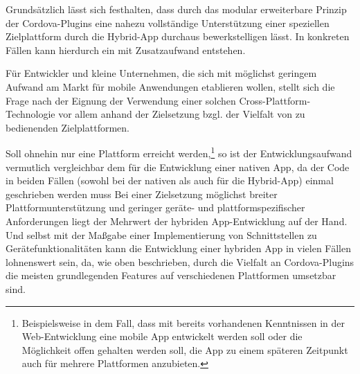 
Grundsätzlich lässt sich festhalten, dass durch das modular erweiterbare Prinzip der Cordova-Plugins eine nahezu vollständige Unterstützung einer speziellen Zielplattform durch die Hybrid-App durchaus bewerkstelligen lässt.
In konkreten Fällen kann hierdurch ein mit Zusatzaufwand entstehen.


Für Entwickler und kleine Unternehmen, die sich mit möglichst geringem Aufwand am Markt für mobile Anwendungen etablieren wollen, stellt sich die Frage nach der Eignung der Verwendung einer solchen Cross-Plattform-Technologie vor allem anhand der Zielsetzung bzgl. der Vielfalt von zu bedienenden Zielplattformen.

Soll ohnehin nur eine Plattform erreicht werden,\footnote{Beispielsweise in dem Fall, dass mit bereits vorhandenen Kenntnissen in der Web-Entwicklung eine mobile App entwickelt werden soll oder die Möglichkeit offen gehalten werden soll, die App zu einem späteren Zeitpunkt auch für mehrere Plattformen anzubieten.} so ist der Entwicklungsaufwand vermutlich vergleichbar dem für die Entwicklung einer nativen App, da der Code in beiden Fällen (sowohl bei der nativen als auch für die Hybrid-App) einmal geschrieben werden muss %
Bei einer Zielsetzung möglichst breiter Plattformunterstützung und geringer geräte- und plattformspezifischer Anforderungen liegt der Mehrwert der hybriden App-Entwicklung auf der Hand.
Und selbst mit der Maßgabe einer Implementierung von Schnittstellen zu Gerätefunktionalitäten kann die Entwicklung einer hybriden App in vielen Fällen lohnenswert sein, da, wie oben beschrieben, durch die Vielfalt an Cordova-Plugins die meisten grundlegenden Features auf verschiedenen Plattformen umsetzbar sind. 

